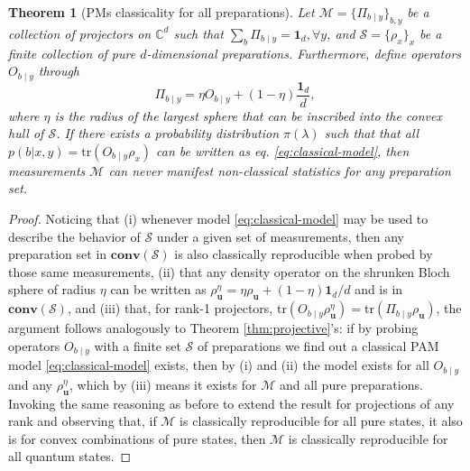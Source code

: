 \documentclass[a4paper,preprintnumbers,floatfix,superscriptaddress,pra,twocolumn,showpacs,notitlepage,longbibliography]{revtex4-2}
\newtheorem{thm}{Theorem}[]
\begin{document}
    \begin{thm}[PMs classicality for all preparations]
        Let $\mathcal{M} = \{ \Pi_{b \mid y } \}_{b, y}$ be a collection of projectors on $\mathbb{C}^d$ such that $\sum_{b} \Pi_{b \mid y } = \bm{1}_d, \forall y $, and $\mathcal{S} = \{ \rho_x \}_x$ be a finite collection of pure $d$-dimensional preparations. Furthermore, define operators $O_{b \mid y}$ through
            \[ \Pi_{b \mid y} = \eta O_{b \mid y} + (1 - \eta) \frac{\bm{1}_d}{d} , \]
        where $\eta$ is the radius of the largest sphere that can be inscribed into the convex hull of $\mathcal{S}$. If there exists a probability distribution $\pi(\lambda)$ such that that all $p(b \vert x, y) = \text{tr}(O_{b\mid y} \rho_x)$ can be written as eq. \eqref{eq:classical-model}, then measurements $\mathcal{M}$ can never manifest non-classical statistics for any preparation set.
        \label{thm:pms-classicality1}
    \end{thm}
    \begin{proof}
        Noticing that (i) whenever model \eqref{eq:classical-model} may be used to describe the behavior of $\mathcal{S}$ under a given set of measurements, then any preparation set in $\textbf{conv}(\mathcal{S})$ is also classically reproducible when probed by those same measurements, (ii) that any density operator on the shrunken Bloch sphere of radius $\eta$ can be written as $\rho_{\bm{u}}^\eta = \eta \rho_{\bm{u}} + (1 - \eta) \bm{1}_d/d$ and is in $\textbf{conv}(\mathcal{S})$, and (iii) that, for rank-1 projectors, $\text{tr}(O_{b\mid y} \rho_{\bm{u}}^\eta) = \text{tr}(\Pi_{b\mid y} \rho_{\bm{u}})$, the argument follows analogously to Theorem \ref{thm:projective}'s: if by probing operators $O_{b \mid y}$ with a finite set $\mathcal{S}$ of preparations we find out a classical PAM model \eqref{eq:classical-model} exists, then by (i) and (ii) the model exists for all $O_{b \mid y}$ and any $\rho_{\bm{u}}^\eta$, which by (iii) means it exists for $\mathcal{M}$ and all pure preparations. Invoking the same reasoning as before to extend the result for projections of any rank and observing that, if $\mathcal{M}$ is classically reproducible for all pure states, it also is for convex combinations of pure states, then $\mathcal{M}$ is classically reproducible for all quantum states.
    \end{proof}
    
\end{document}
